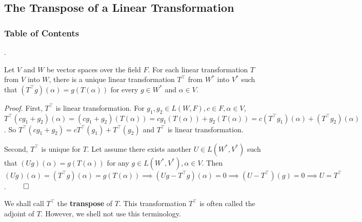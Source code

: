 \documentclass[8pt]{beamer}
\newcommand{\tb}[1]{\textbf{#1}}
\newcommand{\ti}[1]{\textit{#1}}
\begin{document}
\subsection{The Transpose of a Linear Transformation}

\begingroup
    \begin{frame}
        \frametitle{Table of Contents}
        \tableofcontents[currentsubsection]
    \end{frame}
\endgroup

\begin{frame}{.}
    \begin{theorem}
        Let $V$ and $W$ be vector spaces over the field $F$.
        For each linear transformation $T$ from $V$ into $W$, there is a unique linear transformation $T^\top$ from $W^\ast$ into $V^\ast$ such that $(T^\top g) (\alpha) = g(T (\alpha))$ for every $g \in W^\ast$ and $\alpha \in V$.
    \end{theorem}
    \ti{Proof.}
    First, $T^\top$ is linear transformation.
    For $g_1, g_2 \in L(W, F), c \in F, \alpha \in V$, $T^\top(cg_1 + g_2)(\alpha)=(cg_1 + g_2)(T(\alpha)) = cg_1(T(\alpha)) + g_2 (T(\alpha)) = c(T^\top g_1)(\alpha) + (T^\top g_2) (\alpha)$.
    So $T^\top (cg_1 + g_2) = c T^\top (g_1) + T^\top (g_2)$ and $T^\top$ is linear transformation.

    Second, $T^\top$ is unique for $T$. Let assume there exists another $U \in L(W^\ast, V^\ast)$ such that $(Ug)(\alpha) = g(T(\alpha))$ for any $g \in L(W^\ast, V^\ast), \alpha \in V$.
    Then $(Ug)(\alpha) = (T^\top g)(\alpha) =g(T(\alpha)) \implies (Ug -T^\top g)(\alpha) = 0 \implies (U-T^\top)(g) = 0 \implies U = T^\top$.
    $\qed$

    \bigskip
    We shall call $T^\top$ the \tb{transpose} of $T$. This transformation $T^\top$ is often called the adjoint of $T$.
    However, we shell not use this terminology.
\end{frame}
\end{document}
